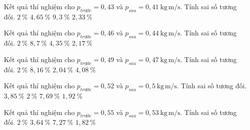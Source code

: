 \begin{ex}
Kết quả thí nghiệm cho $p_{trước}=0,43$ và $p_{sau}=0,41\ \mathrm{kg\,m/s}$. Tính sai số tương đối.
\choice
{$2\ \mathrm{\%}$}
{\True $4,65\ \mathrm{\%}$}
{$9,3\ \mathrm{\%}$}
{$2,33\ \mathrm{\%}$}
\end{ex}

\begin{ex}
Kết quả thí nghiệm cho $p_{trước}=0,46$ và $p_{sau}=0,44\ \mathrm{kg\,m/s}$. Tính sai số tương đối.
\choice
{$2\ \mathrm{\%}$}
{$8,7\ \mathrm{\%}$}
{\True $4,35\ \mathrm{\%}$}
{$2,17\ \mathrm{\%}$}
\end{ex}

\begin{ex}
Kết quả thí nghiệm cho $p_{trước}=0,49$ và $p_{sau}=0,47\ \mathrm{kg\,m/s}$. Tính sai số tương đối.
\choice
{$2\ \mathrm{\%}$}
{$8,16\ \mathrm{\%}$}
{$2,04\ \mathrm{\%}$}
{\True $4,08\ \mathrm{\%}$}
\end{ex}

\begin{ex}
Kết quả thí nghiệm cho $p_{trước}=0,52$ và $p_{sau}=0,5\ \mathrm{kg\,m/s}$. Tính sai số tương đối.
\choice
{\True $3,85\ \mathrm{\%}$}
{$2\ \mathrm{\%}$}
{$7,69\ \mathrm{\%}$}
{$1,92\ \mathrm{\%}$}
\end{ex}

\begin{ex}
Kết quả thí nghiệm cho $p_{trước}=0,55$ và $p_{sau}=0,53\ \mathrm{kg\,m/s}$. Tính sai số tương đối.
\choice
{$2\ \mathrm{\%}$}
{\True $3,64\ \mathrm{\%}$}
{$7,27\ \mathrm{\%}$}
{$1,82\ \mathrm{\%}$}
\end{ex}

